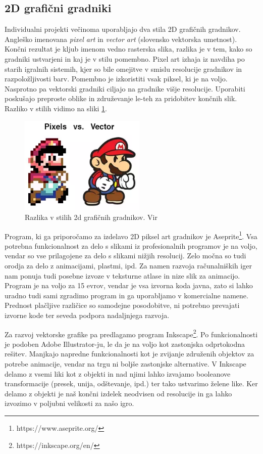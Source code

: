 \documentclass[12pt,a4paper,twoside]{book}
\begin{document}
\subsection{2D grafični gradniki}
Individualni projekti večinoma uporabljajo dva stila 2D grafičnih gradnikov. Angleško imenovana \textit{pixel art} in \textit{vector art} (slovensko vektorska umetnost). Končni rezultat je kljub imenom vedno rasterska slika, razlika je v tem, kako so gradniki ustvarjeni in kaj je v stilu pomembno. Pixel art izhaja iz navdiha po starih igralnih sistemih, kjer so bile omejitve v smislu resolucije gradnikov in razpoložljivosti barv. Pomembno je izkoristiti vsak piksel, ki je na voljo. Nasprotno pa vektorski gradniki ciljajo na gradnike višje resolucije. Uporabiti poskušajo preproste oblike in združevanje le-teh za pridobitev končnih slik. Razliko v stilih vidimo na sliki \ref{slika:pixelVsVector}.

\begin{figure}[h]
	\centering
	\includegraphics[width=6cm]{pixelVsVector}
	\caption{Razlika v stilih 2d grafičnih gradnikov. Vir \cite{pixelVsVector}}
	\label{slika:pixelVsVector}
\end{figure}

Program, ki ga priporočamo za izdelavo 2D piksel art gradnikov je Aseprite\footnote{https://www.aseprite.org/}. Vsa potrebna funkcionalnost za delo s slikami iz profesionalnih programov je na voljo, vendar so vse prilagojene za delo s slikami nižjih resolucij. Zelo močna so tudi orodja za delo z animacijami, plastmi, ipd. Za namen razvoja računalniških iger nam ponuja tudi posebne izvoze v teksturne atlase in nize slik za animacijo. Program je na voljo za 15 evrov, vendar je vsa izvorna koda javna, zato si lahko uradno tudi sami zgradimo program in ga uporabljamo v komercialne namene. Prednost plačljive različice so samodejne posodobitve, ni potrebno prevajati izvorne kode ter seveda podpora nadaljnjega razvoja.

Za razvoj vektorske grafike pa predlagamo program Inkscape\footnote{https://inkscape.org/en/}. Po funkcionalnosti je podoben Adobe Illustrator-ju, le da je na voljo kot zastonjska odprtokodna rešitev. Manjkajo napredne funkcionalnosti kot je zvijanje združenih objektov za potrebe animacije, vendar na trgu ni boljše zastonjske alternative. V Inkscape delamo z vsemi liki kot z objekti in nad njimi lahko izvajamo booleanove transformacije (presek, unija, odštevanje, ipd.) ter tako ustvarimo želene like. Ker delamo z objekti je naš končni izdelek neodvisen od resolucije in ga lahko izvozimo v poljubni velikosti za našo igro. 
\end{document}
